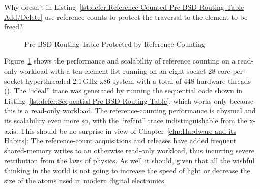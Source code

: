 \QuickQuiz{}
	Why doesn't  in
	Listing~\ref{lst:defer:Reference-Counted Pre-BSD Routing Table Add/Delete}
	use reference counts to
	protect the traversal to the element to be freed?
 \QuickQuizEnd

\begin{figure}[tb]
\centering
{}
\caption{Pre-BSD Routing Table Protected by Reference Counting}
\label{fig:defer:Pre-BSD Routing Table Protected by Reference Counting}
\end{figure}

Figure~\ref{fig:defer:Pre-BSD Routing Table Protected by Reference Counting}
shows the performance and scalability of reference counting on a
read-only workload with a ten-element list running on an eight-socket
28-core-per-socket hyperthreaded 2.1\,GHz x86 system with a total of
448 hardware threads ().
The ``ideal'' trace was generated by running the sequential code shown in
Listing~\ref{lst:defer:Sequential Pre-BSD Routing Table},
which works only because this is a read-only workload.
The reference-counting performance is abysmal and its scalability even
more so, with the ``refcnt'' trace indistinguishable from the x-axis.
This should be no surprise in view of
Chapter~\ref{chp:Hardware and its Habits}:
The reference-count acquisitions and releases have added frequent
shared-memory writes to an otherwise read-only workload, thus
incurring severe retribution from the laws of physics.
As well it should, given that all the wishful thinking in the world
is not going to increase the speed of light or decrease the size of
the atoms used in modern digital electronics.

